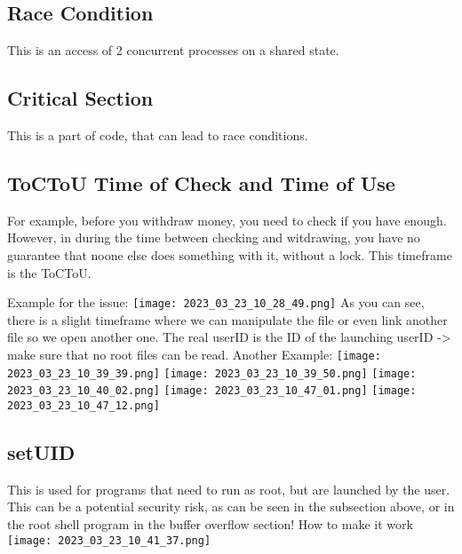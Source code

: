 \documentclass[main.tex,fontsize=8pt,paper=a4,paper=portrait,DIV=calc,]{scrartcl}
\begin{document}
\subsection{Race Condition}
This is an access of 2 concurrent processes on a shared state.

\subsection{Critical Section}
This is a part of code, that can lead to race conditions. 

\subsection{ToCToU Time of Check and Time of Use}
For example, before you withdraw money, you need to check if you have enough.\newline
However, in during the time between checking and witdrawing, you have no guarantee that noone else does something with it, without a lock.\newline
This timeframe is the ToCToU.\newline

Example for the issue: \newline
\texttt{[image: 2023\_03\_23\_10\_28\_49.png]}\newline
As you can see, there is a slight timeframe where we can manipulate the file or even link another file so we open another one.\newline
The real userID is the ID of the launching userID -> make sure that no root files can be read.\newline
Another Example:\newline
\texttt{[image: 2023\_03\_23\_10\_39\_39.png]}\newline
\texttt{[image: 2023\_03\_23\_10\_39\_50.png]}\newline
\texttt{[image: 2023\_03\_23\_10\_40\_02.png]}\newline
\texttt{[image: 2023\_03\_23\_10\_47\_01.png]}\newline
\texttt{[image: 2023\_03\_23\_10\_47\_12.png]}

\subsection{setUID}
This is used for programs that need to run as root, but are launched by the user.\newline
This can be a potential security risk, as can be seen in the subsection above, or in the root shell program in the buffer overflow section!\newline
How to make it work\newline
\texttt{[image: 2023\_03\_23\_10\_41\_37.png]}
\end{document}
